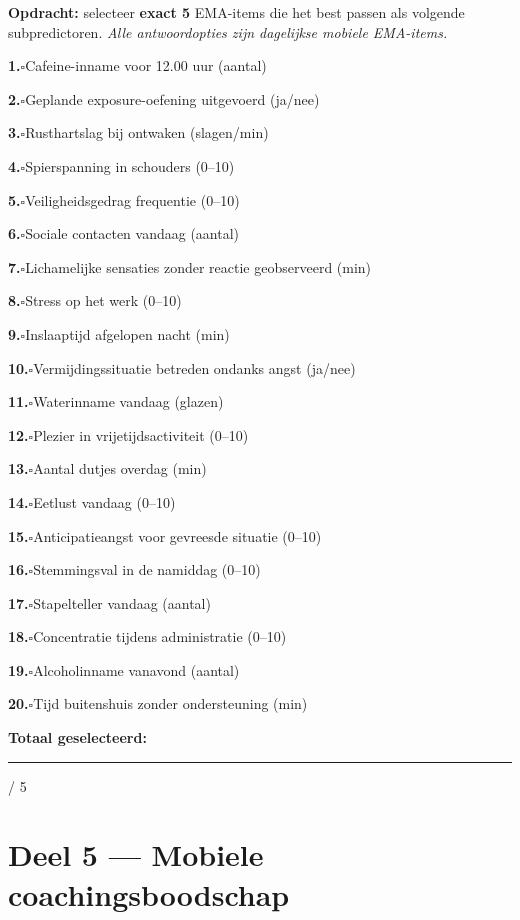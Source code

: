 \documentclass[11pt,a4paper]{article}
\newcommand{\checkitemBFS}[2]{%
\noindent\small\textbf{#1.}\hspace{0.45em}$\square$\hspace{0.4em}#2\par\vspace{0.20em}}
\begin{document}
\begin{responsebox}
\small\textbf{Opdracht:} selecteer \textbf{exact 5} EMA-items die het best passen als volgende subpredictoren.
\textit{Alle antwoordopties zijn dagelijkse mobiele EMA-items.}

\checkitemBFS{1}{Cafeine-inname voor 12.00 uur (aantal)}
\checkitemBFS{2}{Geplande exposure-oefening uitgevoerd (ja/nee)}
\checkitemBFS{3}{Rusthartslag bij ontwaken (slagen/min)}
\checkitemBFS{4}{Spierspanning in schouders (0--10)}
\checkitemBFS{5}{Veiligheidsgedrag frequentie (0--10)}
\checkitemBFS{6}{Sociale contacten vandaag (aantal)}
\checkitemBFS{7}{Lichamelijke sensaties zonder reactie geobserveerd (min)}
\checkitemBFS{8}{Stress op het werk (0--10)}
\checkitemBFS{9}{Inslaaptijd afgelopen nacht (min)}
\checkitemBFS{10}{Vermijdingssituatie betreden ondanks angst (ja/nee)}
\checkitemBFS{11}{Waterinname vandaag (glazen)}
\checkitemBFS{12}{Plezier in vrijetijdsactiviteit (0--10)}
\checkitemBFS{13}{Aantal dutjes overdag (min)}
\checkitemBFS{14}{Eetlust vandaag (0--10)}
\checkitemBFS{15}{Anticipatieangst voor gevreesde situatie (0--10)}
\checkitemBFS{16}{Stemmingsval in de namiddag (0--10)}
\checkitemBFS{17}{Stapelteller vandaag (aantal)}
\checkitemBFS{18}{Concentratie tijdens administratie (0--10)}
\checkitemBFS{19}{Alcoholinname vanavond (aantal)}
\checkitemBFS{20}{Tijd buitenshuis zonder ondersteuning (min)}
\vspace{0.4em}
\noindent\textbf{Totaal geselecteerd:}\hspace{0.5em}\rule{1.2cm}{0.25pt}\hspace{0.2em}/ 5
\end{responsebox}

\vspace{0.6em}
\newpage


\section{Deel 5 --- Mobiele coachingsboodschap}
\end{document}
